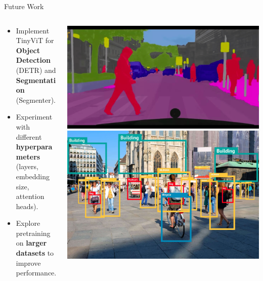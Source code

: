 \begin{frame}[fragile]{Future Work}
  \begin{columns}
    \begin{column}{0.7\textwidth}
      \begin{itemize}
        \item Implement TinyViT for \textbf{Object Detection} (DETR) and \textbf{Segmentation} (Segmenter).
        \item Experiment with different \textbf{hyperparameters} (layers, embedding size, attention heads).
        \item Explore pretraining on \textbf{larger datasets} to improve performance.
      \end{itemize}
    \end{column}
    \begin{column}{0.3\textwidth}
      \includegraphics[width=\textwidth]{images/segmentation.png}
      \includegraphics[width=\textwidth]{images/objectdetection.jpg}
    \end{column}
  \end{columns}
\end{frame}